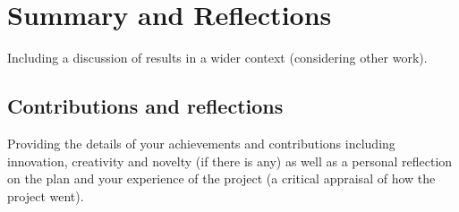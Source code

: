 \chapter{Summary and Reflections}

\label{ch:summary}

Including a discussion of results in a wider context (considering other work).



\section{Contributions and reflections}

Providing the details of your achievements and contributions including innovation, creativity and novelty (if there is any) as well as a personal reflection on the plan and your experience of the project (a critical appraisal of how the project went).

